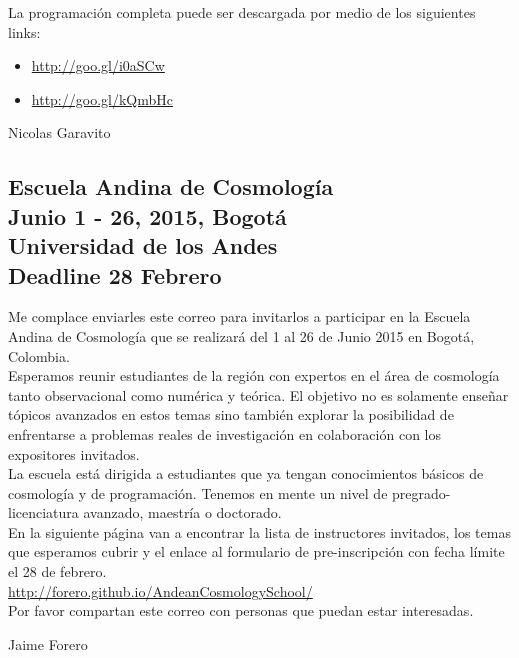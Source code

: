 \documentclass{book}
\begin{document}
\noindent La programación completa puede ser descargada por medio de los siguientes links:

\begin{itemize}
\item \url{http://goo.gl/i0aSCw}
\item \url{http://goo.gl/kQmbHc}
\end{itemize}


\begin{flushright}
Nicolas Garavito
\end{flushright}

\subsection{Escuela Andina de Cosmología\\ Junio 1 - 26, 2015, Bogotá\\ Universidad de los Andes\\ Deadline 28 Febrero}

Me complace enviarles este correo para invitarlos a participar en la Escuela Andina de Cosmología que se realizará del 1 al 26 de Junio 2015 en Bogotá, Colombia.\\

\noindent Esperamos reunir estudiantes de la región con expertos en el área de cosmología tanto observacional como numérica y teórica.
El objetivo no es solamente enseñar tópicos avanzados en estos temas sino también explorar la posibilidad de enfrentarse a problemas reales de investigación en colaboración con los expositores invitados.\\

\noindent La escuela está dirigida a estudiantes que ya tengan conocimientos básicos de cosmología y de programación. Tenemos en mente un nivel de pregrado-licenciatura avanzado, maestría o doctorado.\\

\noindent En la siguiente página van a encontrar la lista de instructores invitados, los temas que esperamos cubrir y el enlace al formulario de pre-inscripción con fecha límite el 28 de febrero.\\

\noindent \url{http://forero.github.io/AndeanCosmologySchool/}\\

\noindent Por favor compartan este correo con personas que puedan estar interesadas.\\

\begin{flushright}
Jaime Forero
\end{flushright}
\end{document}
